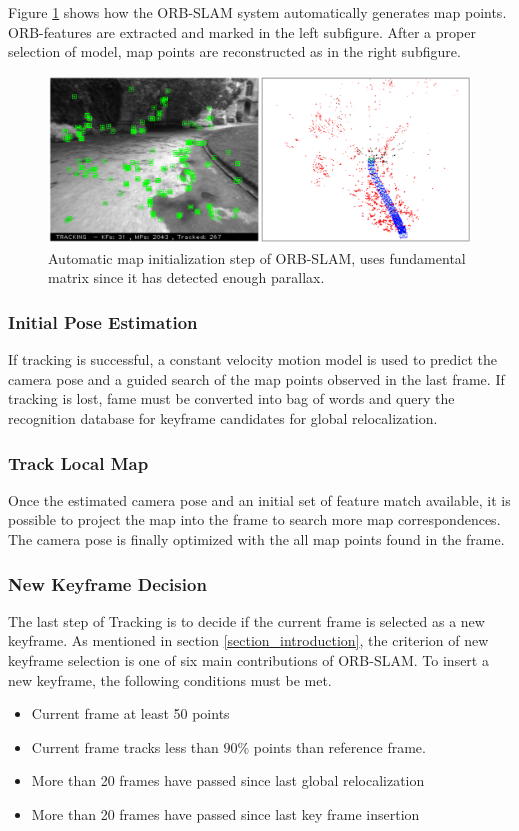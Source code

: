 \documentclass[letterpaper, 10 pt, conference]{ieeeconf}  %
\begin{document}
Figure \ref{initialization_step} shows how the ORB-SLAM system automatically generates map points. ORB-features are extracted and marked in the left subfigure. After a proper selection of model, map points are reconstructed as in the right subfigure.

\begin{figure}[!htbp]%
\centering
\includegraphics[scale=0.185]{./images/initialization_step}
\caption{Automatic map initialization step of ORB-SLAM, uses fundamental matrix since it has detected enough parallax. \cite{ORBSLAM}}
\label{initialization_step}
\end{figure}


\subsubsection{Initial Pose Estimation}
If tracking is successful, a constant velocity motion model is used to predict the camera pose and a guided search of the map points observed in the last frame. If tracking is lost, fame must be converted into bag of words and query the recognition database for keyframe candidates for global relocalization.

\subsubsection{Track Local Map}
Once the estimated camera pose and an initial set of feature match available, it is possible to project the map into the frame to search more map correspondences. The camera pose is finally optimized with the all map points found in the frame.

\subsubsection{New Keyframe Decision}
The last step of Tracking is to decide if the current frame is selected as a new keyframe. As mentioned in section \ref{section_introduction}, the criterion of new keyframe selection is one of six main contributions of ORB-SLAM. To insert a new keyframe, the following conditions must be met.
\begin{itemize}
\item Current frame at least 50 points
\item Current frame tracks less than $90\%$ points than reference frame.
\item More than 20 frames have passed since last global relocalization
\item More than 20 frames have passed since last key frame insertion
\end{itemize}
\end{document}
